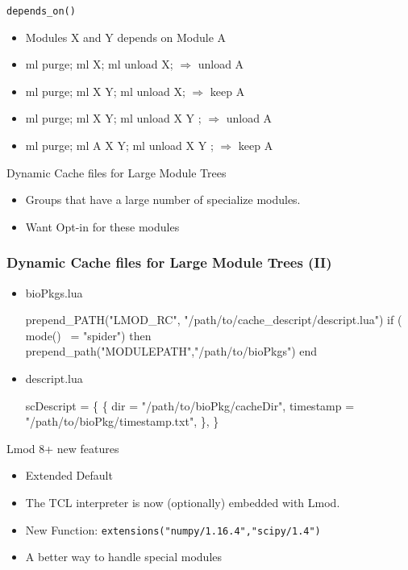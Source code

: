 \documentclass{beamer}
\begin{document}
\begin{frame}{\texttt{depends\_on()}}
  \begin{itemize}
    \item Modules X and Y depends on Module A
    \item ml purge; ml X; ml unload X;      $\Rightarrow$ unload A
    \item ml purge; ml X Y; ml unload X;    $\Rightarrow$ keep A
    \item ml purge; ml X Y; ml unload X Y ; $\Rightarrow$ unload A
    \item ml purge; ml A X Y; ml unload X Y ; $\Rightarrow$ keep A
  \end{itemize}
\end{frame}

\begin{frame}{Dynamic Cache files for Large Module Trees}
  \begin{itemize}
    \item Groups that have a large number of specialize modules.
    \item Want Opt-in for these modules
  \end{itemize}
\end{frame}

\begin{frame}[fragile]
  \frametitle{Dynamic Cache files for Large Module Trees (II)}
  \begin{itemize}
    \item bioPkgs.lua
    {\tiny
\begin{semiverbatim}
  prepend\_PATH("LMOD\_RC", "/path/to/cache\_descript/descript.lua")
  if ( mode() ~= "spider") then 
     prepend\_path("MODULEPATH","/path/to/bioPkgs")
  end
\end{semiverbatim}
    }
    \item descript.lua
    {\tiny
\begin{semiverbatim}
  scDescript = \{
     \{
        dir = "/path/to/bioPkg/cacheDir",
        timestamp = "/path/to/bioPkg/timestamp.txt",
     \},
  \}
\end{semiverbatim}
    }
    \end{itemize}
\end{frame}


\begin{frame}{Lmod 8+ new features}
  \begin{itemize}
    \item Extended Default
    \item The TCL interpreter is now (optionally) embedded with Lmod.
    \item New Function: \texttt{extensions("numpy/1.16.4","scipy/1.4")}
    \item A better way to handle special modules
  \end{itemize}
\end{frame}
\end{document}
